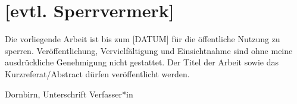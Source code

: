 \thispagestyle{empty}


\section*{[evtl. Sperrvermerk]}
Die vorliegende Arbeit ist bis zum [DATUM] für die öffentliche Nutzung zu sperren. Veröffentlichung, Vervielfältigung und Einsichtnahme sind ohne meine ausdrückliche Genehmigung nicht gestattet. Der Titel der Arbeit sowie das Kurzreferat/Abstract dürfen veröffentlicht werden.

\vspace{3cm}

\noindent Dornbirn, \hfill Unterschrift Verfasser*in